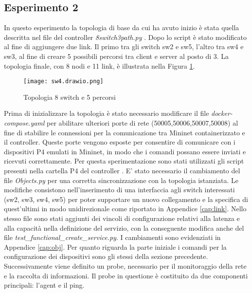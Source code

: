 \subsection{Esperimento 2}
In questo esperimento la topologia di base da cui ha avuto inizio è stata quella descritta nel file del controller \textit{8switch3path.py} \cite{8sw}.
Dopo lo script è stato modificato al fine di aggiungere due link.
Il primo tra gli switch sw2 e sw5, l'altro tra sw4 e sw3, al fine di creare 5 possibili percorsi tra client e server al posto di 3. 
La topologia finale, con 8 nodi e 11 link, è illustrata nella Figura \ref{fig:top8}. 
\begin{figure}[h]
    \centering
    \texttt{[image: sw4.drawio.png]}
    \caption{Topologia 8 switch e 5 percorsi}
    \label{fig:top8}
\end{figure}
\newline Prima di inizializzare la topologia è stato necessario modificare il file \textit{docker-compose.yaml}
per abilitare ulteriori porte di rete (50005,50006,50007,50008) al fine di stabilire le connessioni per la comunicazione 
tra Mininet containerizzato e il controller.
Queste porte vengono esposte per consentire di comunicare con i dispositivi P4 emulati in Mininet, in modo che i comandi possano essere inviati e ricevuti correttamente.
\newline Per questa sperimentazione sono stati utilizzati gli script presenti nella cartella P4 del controller \cite{ofc}.
E' stato necessario il cambiamento del file \textit{Objects.py} per una corretta sincronizzazione con la topologia istanziata.
Le modifiche consistono nell'inserimento di una interfaccia agli switch interessati (sw2, sw3, sw4, sw5) per poter 
supportare un nuovo collegamento e la specifica di quest'ultimi in modo unidirezionale come riportato in Appendice \ref{cap:link}.
Nello stesso file sono stati aggiunti dei vincoli di configurazione relativi alla latenza e alla capacità nella definizione del servizio, con la conseguente modifica anche del file \textit{test\_functional\_create\_service.py}.
I cambiamenti sono evidenziati in Appendice \ref{cap:obj}.
\newline Per quanto riguarda la parte iniziale i comandi per la configurazione dei dispositivi sono gli stessi della sezione precedente.
\newline Successivamente viene definito un probe, necessario per il monitoraggio della rete e la raccolta di informazioni.
Il probe in questione è costituito da due componenti principali: l'agent e il ping.
